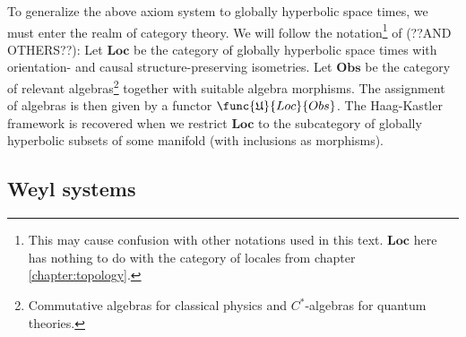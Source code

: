     To generalize the above axiom system to globally hyperbolic space times, we must enter the realm of category theory. We will follow the notation\footnote{This may cause confusion with other notations used in this text. $\mathbf{Loc}$ here has nothing to do with the category of locales from chapter \ref{chapter:topology}.} of \cite{cal_strobl} (??AND OTHERS??): Let $\textbf{Loc}$ be the category of globally hyperbolic space times with orientation- and causal structure-preserving isometries. Let $\textbf{Obs}$ be the category of relevant algebras\footnote{Commutative algebras for classical physics and $C^*$-algebras for quantum theories.} together with suitable algebra morphisms. The assignment of algebras is then given by a functor $\func{\mathfrak{U}}{Loc}{Obs}$. The Haag-Kastler framework is recovered when we restrict $\textbf{Loc}$ to the subcategory of globally hyperbolic subsets of some manifold (with inclusions as morphisms).

\subsection{Weyl systems}




